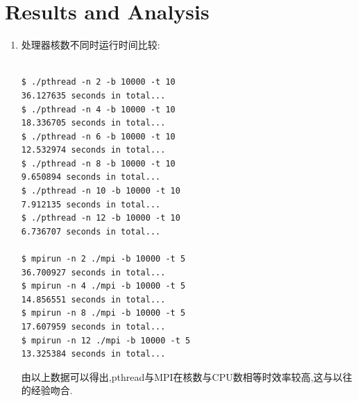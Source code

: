 \section{Results and Analysis}


\begin{enumerate}

\item 处理器核数不同时运行时间比较:

\begin{lstlisting}

$ ./pthread -n 2 -b 10000 -t 10                                                                                                                                                                                                                
36.127635 seconds in total...
$ ./pthread -n 4 -b 10000 -t 10                                                                                                                                                                                                                
18.336705 seconds in total...
$ ./pthread -n 6 -b 10000 -t 10                                                                                                                                                                                                                
12.532974 seconds in total...
$ ./pthread -n 8 -b 10000 -t 10                                                                                                                                                                                                                
9.650894 seconds in total...
$ ./pthread -n 10 -b 10000 -t 10
7.912135 seconds in total...
$ ./pthread -n 12 -b 10000 -t 10
6.736707 seconds in total...

$ mpirun -n 2 ./mpi -b 10000 -t 5
36.700927 seconds in total...
$ mpirun -n 4 ./mpi -b 10000 -t 5                                                                                                                                                                                                              
14.856551 seconds in total...
$ mpirun -n 8 ./mpi -b 10000 -t 5                                                                                                                                                                                                              
17.607959 seconds in total...
$ mpirun -n 12 ./mpi -b 10000 -t 5                                                                                                                                                                                                             
13.325384 seconds in total...
\end{lstlisting}
	由以上数据可以得出,pthread与MPI在核数与CPU数相等时效率较高,这与以往的经验吻合.


\end{enumerate}
